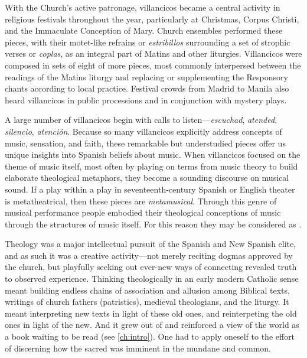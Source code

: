 With the Church's active patronage, villancicos became a central activity in
religious festivals throughout the year, particularly at Christmas, Corpus
Christi, and the Immaculate Conception of Mary. 
Church ensembles performed these pieces, with their motet-like refrains or
\emph{estribillos} surrounding a set of strophic verses or \emph{coplas}, as an
integral part of Matins and other liturgies.
Villancicos were composed in sets of eight of more pieces, most commonly
interpersed between the readings of the Matins liturgy and replacing or
supplementing the Responsory chants according to local practice.
Festival crowds from Madrid to Manila also heard villancicos in public
processions and in conjunction with mystery plays. 

A large number of villancicos begin with calls to listen---\emph{escuchad},
\emph{atended}, \emph{silencio}, \emph{atención}. 
Because so many villancicos explicitly address concepts of music, sensation, and
faith, these remarkable but understudied pieces offer us unique insights into
Spanish beliefs about music.
When villancicos focused on the theme of music itself, most often by playing on
terms from music theory to build elaborate theological metaphors, they become a
sounding discourse on musical sound.
If a play within a play in seventeenth-century Spanish or English theater is
metatheatrical, then these pieces are \emph{metamusical}.
Through this genre of musical performance people embodied their theological
conceptions of music through the structures of music itself.
For this reason they may be considered as .

Theology was a major intellectual pursuit of the Spanish and New Spanish elite,
and as such it was a creative activity---not merely reciting dogmas
approved by the church, but playfully seeking out ever-new ways of connecting
revealed truth to observed experience.
Thinking theologically in an early modern Catholic sense meant building 
endless chains of association and allusion among Biblical texts, writings of
church fathers (patristics), medieval theologians, and the liturgy. 
It meant interpreting new texts in light of these old ones, and reinterpeting
the old ones in light of the new.
And it grew out of and reinforced a view of the world as a book waiting to be
read (see \cref{ch:intro}).
One had to apply oneself to the effort of discerning how the sacred was
imminent in the mundane and common.%
    \Autocite{Chavez:DistortingReality}

